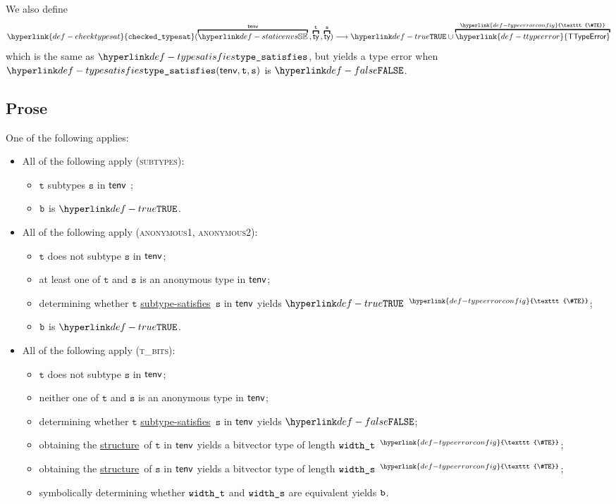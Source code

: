 \documentclass{book}
\newcommand\TTypeError[0]{\hyperlink{def-ttypeerror}{\textsf{TTypeError}}}
\newcommand\TypeErrorConfig[0]{\hyperlink{def-typeerrorconfig}{\texttt{\#TE}}}
\newcommand\ProseOrTypeError[0]{\hyperlink{def-proseortypeerror}{$^{\TypeErrorConfig}$}}
\newcommand\checktypesat[0]{\hyperlink{def-checktypesat}{\texttt{checked\_typesat}}}
\newcommand\structure[0]{\hyperlink{def-structure}{structure}}
\newcommand\subtypesatisfies[0]{\hyperlink{def-subtypesatisfies}{subtype-satisfies}}
\newcommand\vt[0]{\texttt{t}}
\newcommand\vs[0]{\texttt{s}}
\begin{document}
\hypertarget{def-checktypesat}{}
We also define
\[
  \checktypesat(\overname{\staticenvs}{\tenv} \aslsep \overname{\ty}{\vt} \aslsep \overname{\ty}{\vs})
  \aslto \True \cup \overname{\TTypeError}{\TypeErrorConfig}
\]
which is the same as $\typesat$, but yields a type error when \\ $\typesat(\tenv, \vt, \vs)$ is $\False$.

\subsection{Prose}
One of the following applies:
 \begin{itemize}
  \item All of the following apply (\textsc{subtypes}):
    \begin{itemize}
    \item $\vt$ subtypes $\vs$ in $\textsf{tenv}$ ;
    \item $\texttt{b}$ is $\True$.
  \end{itemize}

  \item All of the following apply (\textsc{anonymous1}, \textsc{anonymous2}):
  \begin{itemize}
    \item $\vt$ does not subtype $\vs$ in $\textsf{tenv}$;
    \item at least one of $\vt$ and $\vs$ is an anonymous type in $\textsf{tenv}$;
    \item determining whether $\vt$ \subtypesatisfies\ $\vs$ in $\textsf{tenv}$ yields $\True$ \ProseOrTypeError;
    \item $\texttt{b}$ is $\True$.
  \end{itemize}

  \item All of the following apply (\textsc{t\_bits}):
  \begin{itemize}
    \item $\vt$ does not subtype $\vs$ in $\textsf{tenv}$;
    \item neither one of $\vt$ and $\vs$ is an anonymous type in $\textsf{tenv}$;
    \item determining whether $\vt$ \subtypesatisfies\ $\vs$ in $\textsf{tenv}$ yields $\False$;
    \item obtaining the \structure\ of $\vt$ in $\textsf{tenv}$ yields a bitvector type of length $\texttt{width\_t}$ \ProseOrTypeError;
    \item obtaining the \structure\ of $\vs$ in $\textsf{tenv}$ yields a bitvector type of length $\texttt{width\_s}$ \ProseOrTypeError;
    \item symbolically determining whether $\texttt{width\_t}$ and $\texttt{width\_s}$ are equivalent yields $\texttt{b}$.
  \end{itemize}


\end{itemize}
\end{document}
